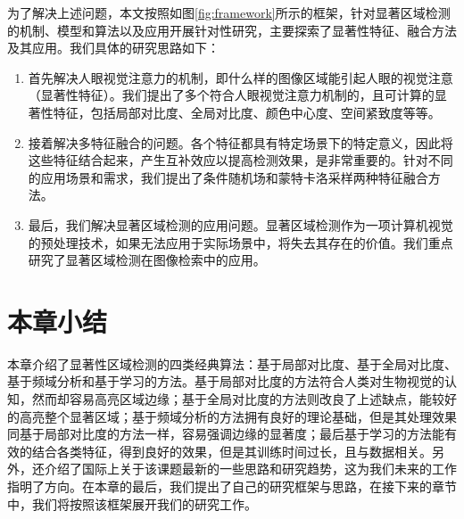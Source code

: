 为了解决上述问题，本文按照如图\ref{fig:framework}所示的框架，针对显著区域检测的机制、模型和算法以及应用开展针对性研究，主要探索了显著性特征、融合方法及其应用。我们具体的研究思路如下：
\begin{enumerate}
\item 首先解决人眼视觉注意力的机制，即什么样的图像区域能引起人眼的视觉注意（显著性特征）。我们提出了多个符合人眼视觉注意力机制的，且可计算的显著性特征，包括局部对比度、全局对比度、颜色中心度、空间紧致度等等。
\item 接着解决多特征融合的问题。各个特征都具有特定场景下的特定意义，因此将这些特征结合起来，产生互补效应以提高检测效果，是非常重要的。针对不同的应用场景和需求，我们提出了条件随机场和蒙特卡洛采样两种特征融合方法。
\item 最后，我们解决显著区域检测的应用问题。显著区域检测作为一项计算机视觉的预处理技术，如果无法应用于实际场景中，将失去其存在的价值。我们重点研究了显著区域检测在图像检索中的应用。
\end{enumerate}

\section{本章小结}
本章介绍了显著性区域检测的四类经典算法：基于局部对比度、基于全局对比度、基于频域分析和基于学习的方法。基于局部对比度的方法符合人类对生物视觉的认知，然而却容易高亮区域边缘；基于全局对比度的方法则改良了上述缺点，能较好的高亮整个显著区域；基于频域分析的方法拥有良好的理论基础，但是其处理效果同基于局部对比度的方法一样，容易强调边缘的显著度；最后基于学习的方法能有效的结合各类特征，得到良好的效果，但是其训练时间过长，且与数据相关。另外，还介绍了国际上关于该课题最新的一些思路和研究趋势，这为我们未来的工作指明了方向。在本章的最后，我们提出了自己的研究框架与思路，在接下来的章节中，我们将按照该框架展开我们的研究工作。

